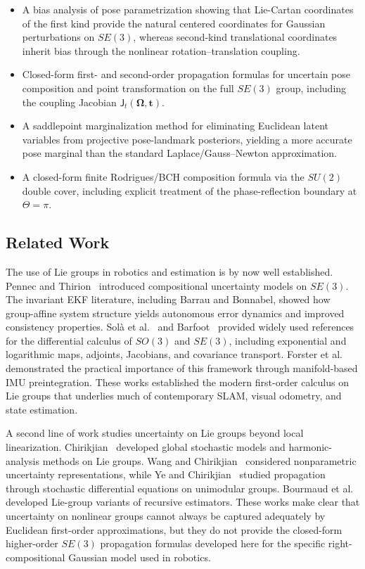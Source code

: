 \documentclass[journal]{IEEEtran}
\newcommand{\bfOmega}{\boldsymbol{\Omega}}
\begin{document}
\begin{itemize}
\item A bias analysis of pose parametrization showing that
Lie-Cartan coordinates of the first kind provide the natural
centered coordinates for Gaussian perturbations on $SE(3)$,
whereas second-kind translational coordinates inherit bias
through the nonlinear rotation--translation coupling.

\item Closed-form first- and second-order propagation formulas
for uncertain pose composition and point transformation on
the full $SE(3)$ group, including the coupling Jacobian
$\mathsf{J}_t(\bfOmega,\mathbf{t})$.

\item A saddlepoint marginalization method for eliminating
Euclidean latent variables from projective pose-landmark
posteriors, yielding a more accurate pose marginal than the
standard Laplace/Gauss--Newton approximation.

\item A closed-form finite Rodrigues/BCH composition formula
via the $SU(2)$ double cover, including explicit treatment of
the phase-reflection boundary at $\Theta=\pi$.
\end{itemize}

\subsection{Related Work}

The use of Lie groups in robotics and estimation is by now
well established. Pennec and Thirion~\cite{pennec97}
introduced compositional uncertainty models on $SE(3)$.
The invariant EKF literature, including Barrau and Bonnabel,
showed how group-affine system structure yields autonomous
error dynamics and improved consistency properties.
Sol\`a et al.~\cite{sola2018micro} and Barfoot~\cite{barfoot2024}
provided widely used references for the differential calculus of
$SO(3)$ and $SE(3)$, including exponential and logarithmic
maps, adjoints, Jacobians, and covariance transport.
Forster et al.~\cite{forster2017manifold} demonstrated the
practical importance of this framework through manifold-based
IMU preintegration. These works established the modern
first-order calculus on Lie groups that underlies much of
contemporary SLAM, visual odometry, and state estimation.

A second line of work studies uncertainty on Lie groups beyond
local linearization. Chirikjian~\cite{chirikjian2012stochastic}
developed global stochastic models and harmonic-analysis
methods on Lie groups. Wang and Chirikjian~\cite{wang2008nonparametric}
considered nonparametric uncertainty representations, while
Ye and Chirikjian~\cite{ye2024uncertainty} studied propagation
through stochastic differential equations on unimodular groups.
Bourmaud et al.~\cite{bourmaud2013discrete} developed
Lie-group variants of recursive estimators. These works make
clear that uncertainty on nonlinear groups cannot always be
captured adequately by Euclidean first-order approximations,
but they do not provide the closed-form higher-order
$SE(3)$ propagation formulas developed here for the specific
right-compositional Gaussian model used in robotics.
\end{document}
